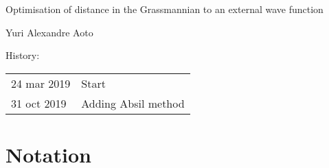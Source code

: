 \documentclass[a4paper,11pt]{article}
\begin{document}
\begin{center}
  {\LARGE Optimisation of distance in the Grassmannian to an external wave function}\vspace{1.0cm}

  {\Large Yuri Alexandre Aoto}
\end{center}
{History:
  
  \begin{tabular}{l@{ - }l}
    24 mar 2019 & Start\\
    31 oct 2019 & Adding Absil method\\
  \end{tabular}
}\vspace{3cm}


\section{Notation}
\end{document}
